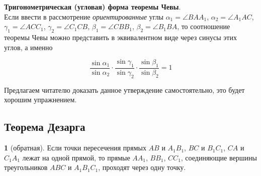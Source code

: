 \documentclass[14pt]{extarticle}
\theoremstyle{definition}
\theoremstyle{theorem}
\newenvironment{namedtheorem}[2]
{
\newcommand{\foo}{#1}
\newtheorem*{\foo{}}{\normalfont\fontsize{15}{15}{Теорема #2}}
\begin{\foo{}}
}
{\end{\foo{}}}
\begin{document}
\begin{figure}
	\hspace{-1cm}
\end{figure}

\noindent \textbf{\small Тригонометрическая (угловая) форма теоремы Чевы}.\\
Если ввести в рассмотрение \textit{ориентированные} углы $\alpha_1 = \angle BAA_1$, 
$\alpha_2 = \angle A_1AC$, $\gamma_1 = \angle ACC_1$, $\gamma_2 = \angle C_1CB$,
$\beta_1 = \angle CBB_1$, $\beta_2 = \angle B_1BA$, то соотношение теоремы
Чевы можно представить в эквивалентном виде через синусы этих углов, а именно


{\setlength{\mathindent}{2.5cm}
\begin{equation*}
\dfrac{\sin \alpha_1}{\sin \alpha_2} \cdot 
	\dfrac{\sin \gamma_1}{\sin \gamma_2} 
\cdot \dfrac{\sin \beta_1}{\sin \beta_2} = 1 
\end{equation*}}
	


Предлагаем читателю доказать данное  утверждение самостоятельно, это 
будет хорошим упражнением.

\subsection{Теорема Дезарга}
\begin{namedtheorem}{dezarg}{Дезарга}[обратная]
Если точки пересечения прямых \(AB\) и \(A_1B_1\), \(BC\) и \(B_1C_1\), 
\(CA\) и \(C_1A_1\) лежат на одной прямой, то 
прямые \(AA_1\), \(BB_1\), \(CC_1\), соединяющие вершины треугольников 
\(ABC\) и \(A_1B_1C_1\), проходят через одну точку.
\end{namedtheorem}
\end{document}
